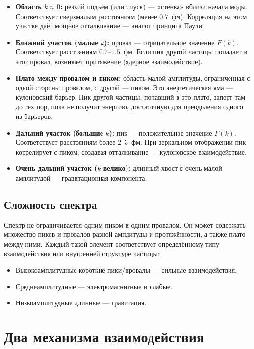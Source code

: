 \documentclass[12pt,a4paper]{article}
\begin{document}
\begin{itemize}
    \item \textbf{Область $k \approx 0$:} резкий подъём (или спуск) --- «стенка» вблизи начала моды. Соответствует сверхмалым расстояниям (менее $0.7$~фм). Корреляция на этом участке даёт мощное отталкивание --- аналог принципа Паули.
    \item \textbf{Ближний участок (малые $k$):} провал --- отрицательное значение $F(k)$. Соответствует расстояниям $0.7$--$1.5$~фм. Если пик другой частицы попадает в этот провал, возникает притяжение (ядерное взаимодействие).
    \item \textbf{Плато между провалом и пиком:} область малой амплитуды, ограниченная с одной стороны провалом, с другой --- пиком. Это энергетическая яма --- кулоновский барьер. Пик другой частицы, попавший в это плато, заперт там до тех пор, пока не получит энергию, достаточную для преодоления одного из барьеров.
    \item \textbf{Дальний участок (большие $k$):} пик --- положительное значение $F(k)$. Соответствует расстояниям более $2$--$3$~фм. При зеркальном отображении пик коррелирует с пиком, создавая отталкивание --- кулоновское взаимодействие.
    \item \textbf{Очень дальний участок ($k$ велико):} длинный хвост с очень малой амплитудой --- гравитационная компонента.
\end{itemize}

\subsection{Сложность спектра}
Спектр не ограничивается одним пиком и одним провалом. Он может содержать множество пиков и провалов разной амплитуды и протяжённости, а также плато между ними. Каждый такой элемент соответствует определённому типу взаимодействия или внутренней структуре частицы:

\begin{itemize}
    \item Высокоамплитудные короткие пики/провалы --- сильные взаимодействия.
    \item Среднеамплитудные --- электромагнитные и слабые.
    \item Низкоамплитудные длинные --- гравитация.
\end{itemize}

\section{Два механизма взаимодействия}
\end{document}
